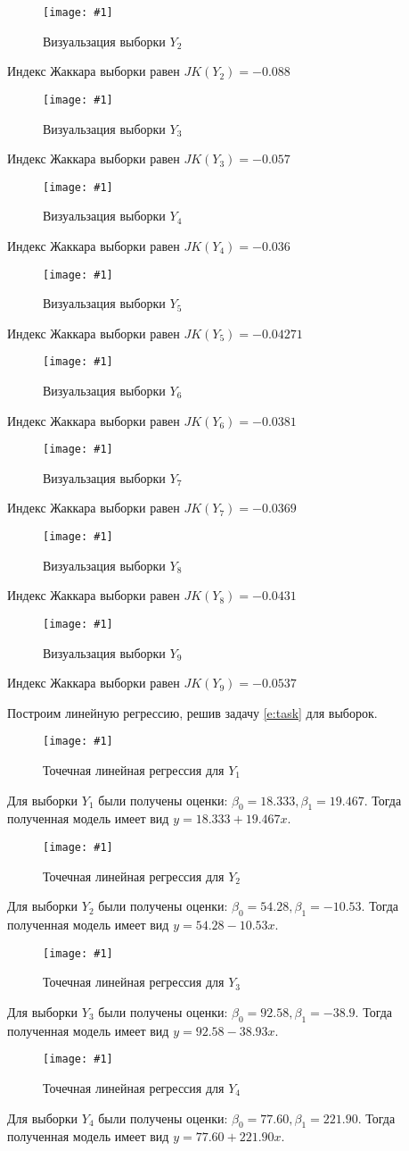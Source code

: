 \documentclass[a4paper,12pt]{article}
\newcommand{\plot}[3]{
    \begin{figure}[H]
        \begin{center}
            \texttt{[image: \#1]}
            \caption{#2}
            \label{#3}
        \end{center}
    \end{figure}
}
\begin{document}
    \plot{sampleY2}{Визуальзация выборки $ Y_2 $}{p:sampleY2}
        Индекс Жаккара выборки равен $ JK(Y_2) = -0.088 $
    
    \plot{sampleY3}{Визуальзация выборки $ Y_3 $}{p:sampleY3}
        Индекс Жаккара выборки равен $ JK(Y_3) = -0.057 $
    
    \plot{sampleY4}{Визуальзация выборки $ Y_4 $}{p:sampleY4}
        Индекс Жаккара выборки равен $ JK(Y_4) = -0.036 $
    
    \plot{sampleY5}{Визуальзация выборки $ Y_5 $}{p:sampleY5}
        Индекс Жаккара выборки равен $ JK(Y_5) = -0.04271 $
    
    \plot{sampleY6}{Визуальзация выборки $ Y_6 $}{p:sampleY6}
        Индекс Жаккара выборки равен $ JK(Y_6) = -0.0381 $
    
    \plot{sampleY7}{Визуальзация выборки $ Y_7 $}{p:sampleY7}
        Индекс Жаккара выборки равен $ JK(Y_7) = -0.0369 $
    
    \plot{sampleY8}{Визуальзация выборки $ Y_8 $}{p:sampleY8}
        Индекс Жаккара выборки равен $ JK(Y_8) = -0.0431 $
    
    \plot{sampleY9}{Визуальзация выборки $ Y_9 $}{p:sampleY9}
        Индекс Жаккара выборки равен $ JK(Y_9) = -0.0537 $
    

    Построим линейную регрессию, решив задачу \ref{e:task} для выборок.
    \plot{PointRegressionsampleY1}{Точечная линейная регрессия для $ Y_1 $}{p:regressionY1}
    Для выборки $ Y_1 $ были получены оценки: $ \beta_0 = 18.333, \beta_1 =19.467  $.
    Тогда полученная модель имеет вид $ y =  18.333 + 19.467 x $.
    
    \plot{PointRegressionsampleY2}{Точечная линейная регрессия для $ Y_2 $}{p:regressionY2}
        Для выборки $ Y_2 $ были получены оценки: $ \beta_0 = 54.28, \beta_1 = -10.53 $.
    Тогда полученная модель имеет вид $ y =  54.28 - 10.53 x $.
    
    \plot{PointRegressionsampleY3}{Точечная линейная регрессия для $ Y_3 $}{p:regressionY3}
        Для выборки $ Y_3 $ были получены оценки: $ \beta_0 = 92.58, \beta_1 = -38.9 $.
    Тогда полученная модель имеет вид $ y = 92.58 -38.93 x $.
    
    \plot{PointRegressionsampleY4}{Точечная линейная регрессия для $ Y_4 $}{p:regressionY4}    
        Для выборки $ Y_4 $ были получены оценки: $ \beta_0 = 77.60, \beta_1 = 221.90 $.
    Тогда полученная модель имеет вид $ y =  77.60 + 221.90 x $.
    
\end{document}
